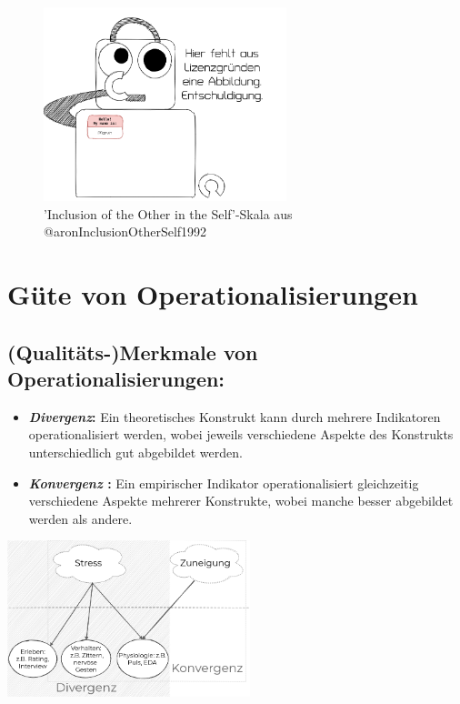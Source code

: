 \documentclass[
]{book}
\begin{document}
\begin{figure}

{\centering \includegraphics[width=200pt]{imgs/copyright} 

}

\caption{'Inclusion of the Other in the Self'-Skala aus @aronInclusionOtherSelf1992}\label{fig:unnamed-chunk-89}
\end{figure}

\hypertarget{guxfcte-von-operationalisierungen}{%
\section{Güte von Operationalisierungen}\label{guxfcte-von-operationalisierungen}}

\hypertarget{qualituxe4ts-merkmale-von-operationalisierungen}{%
\subsection{(Qualitäts-)Merkmale von Operationalisierungen:}\label{qualituxe4ts-merkmale-von-operationalisierungen}}

\begin{itemize}
\item
  \textbf{\emph{Divergenz}:} Ein theoretisches Konstrukt kann durch mehrere Indikatoren operationalisiert werden, wobei jeweils verschiedene Aspekte des Konstrukts unterschiedlich gut abgebildet werden.
\item
  \textbf{\emph{Konvergenz} :} Ein empirischer Indikator operationalisiert gleichzeitig verschiedene Aspekte mehrerer Konstrukte, wobei manche besser abgebildet werden als andere.
\end{itemize}

\begin{center}\includegraphics[width=200pt]{imgs/operartionalisierung_konvdiv} \end{center}
\end{document}
